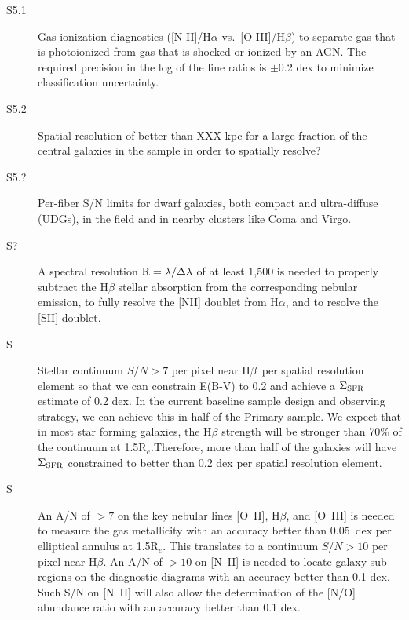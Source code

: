 \documentclass[preprint,11pt]{aastex}
\newcommand{\Hbeta}{{H$\beta$}}
\newcommand{\Reff}{{R$_{e}$}}
\begin{document}
\begin{description}

\item[S5.1] Gas ionization diagnostics ([N II]/H$\alpha$ vs.\ 
[O III]/H$\beta$) to separate gas that is photoionized from gas 
that is shocked or ionized by an AGN. The required precision in 
the log of the line ratios is $\pm$0.2 dex to minimize classification 
uncertainty.

\item[S5.2] Spatial resolution of better than XXX kpc for a large
  fraction of the central galaxies in the sample in order to spatially
  resolve?

\item[S5.?] Per-fiber S/N limits for dwarf galaxies, both compact and
ultra-diffuse (UDGs), in the field and in nearby clusters like Coma
and Virgo.

\item [S?] A spectral resolution $\rm R=\lambda/\Delta \lambda$ of
  at least 1,500 is needed to properly subtract the H$\beta$ stellar
  absorption from the corresponding nebular emission, to fully resolve
  the [NII] doublet from H$\alpha$, and to resolve the [SII] doublet.

\item [S] Stellar continuum $S/N > 7$ per pixel near \Hbeta\ per
  spatial resolution element so that we can constrain E(B-V) to 0.2
  and achieve a ${\rm \Sigma_{SFR}}$ estimate of 0.2 dex. In the
  current baseline sample design and observing strategy, we can
  achieve this in half of the Primary sample. We expect that in most
  star forming galaxies, the H$\beta$ strength will be stronger than
  70\% of the continuum at 1.5\Reff.Therefore, more than half of the
  galaxies will have ${\rm \Sigma_{SFR}}$ constrained to better than
  0.2 dex per spatial resolution element.

\item [S] An A/N of $>7$ on the key nebular lines [O~II], H$\beta$, and
  [O~III] is needed to measure the gas metallicity with an accuracy
  better than 0.05~dex per elliptical annulus at 1.5\Reff. This translates
  to a continuum $S/N > 10$ per pixel near \Hbeta.
  An A/N of $>10$ on [N~II] is needed to locate galaxy sub-regions on the
  diagnostic diagrams with an accuracy better than 0.1 dex. Such S/N
  on [N~II] will also allow the determination of the [N/O] abundance
  ratio with an accuracy better than 0.1 dex.  %


\end{description}
\end{document}
